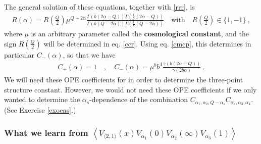 \documentclass[12pt, a4paper, notitlepage, twoside]{report}
\numberwithin{equation}{section}
\theoremstyle{break}
\begin{document}
The general solution of these equations, together with \eqref{rrr}, is
\begin{align}
 \boxed{R(\alpha) = R(\tfrac{Q}{2})\mu^{Q-2\alpha} \frac{\Gamma(b(2\alpha-Q))\Gamma(\frac{1}{b}(2\alpha-Q))}{\Gamma(b(Q-2\alpha))\Gamma(\frac{1}{b}(Q-2\alpha))}} \quad \text{with} \quad R(\tfrac{Q}{2})\in \{1, -1\}  \ ,
\label{ram}
\end{align}
where $\mu$ is an arbitrary parameter called the \textbf{\boldmath cosmological constant},
and the sign $R(\frac{Q}{2})$ will be determined in eq. \eqref{ccr}.
Using eq. \eqref{cmcp}, this determines in particular $C_-(\alpha)$, so that we have
\begin{align}
 C_+(\alpha)=1 \quad , \quad C_-(\alpha) = \mu^b b^4 \frac{\gamma(b(2\alpha-Q))}{\gamma(2b\alpha)}\ .
\label{cpm}
\end{align}
We will need these OPE coefficients for in order to determine the three-point structure constant. 
However, we would not need these OPE coefficients 
if we only wanted to determine the $\alpha_s$-dependence of the combination $C_{\alpha_1,\alpha_2,Q-\alpha_s}C_{\alpha_s,\alpha_3,\alpha_4}$. (See Exercise \ref{exocas}.)


\subsubsection{What we learn from $\left\langle V_{\langle 2,1 \rangle}(x)V_{\alpha_1}(0)V_{\alpha_2}(\infty)V_{\alpha_3}(1)\right\rangle$}
\end{document}
